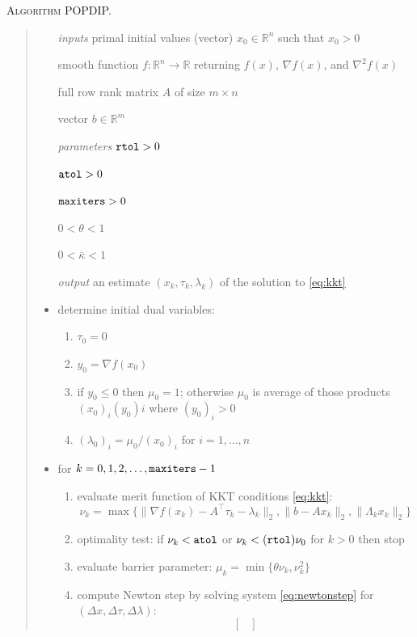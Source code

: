 \documentclass[11pt]{article}
\newcommand{\RR}{\mathbb{R}}
\newcommand{\grad}{\nabla}
\begin{document}
\bigskip
\noindent \textsc{Algorithm POPDIP.}
\begin{quote}
\begin{itemize}
\item[\emph{inputs}]  primal initial values (vector) $x_0\in\RR^n$ such that $x_0 > 0$
\item[]  smooth function $f:\RR^n\to\RR$ returning $f(x)$, $\grad f(x)$, and $\grad^2 f(x)$
\item[]  full row rank matrix $A$ of size $m\times n$
\item[]  vector $b\in\RR^m$
\item[\emph{parameters}]  $\text{\texttt{rtol}}>0$
\item[]  $\text{\texttt{atol}}>0$
\item[]  $\text{\texttt{maxiters}}>0$
\item[]  $0<\theta<1$
\item[]  $0<\bar\kappa<1$
\item[\emph{output}]  an estimate $(x_k,\tau_k,\lambda_k)$ of the solution to \eqref{eq:kkt}
\item  determine initial dual variables:
    \renewcommand{\labelenumi}{(\roman{enumi})}
    \begin{enumerate}
    \item $\tau_0 = 0$
    \item $y_0 = \grad f(x_0)$
    \item if $y_0 \le 0$ then $\mu_0=1$; otherwise $\mu_0$ is average of those products $(x_0)_i (y_0)i$ where $(y_0)_i > 0$
    \item $(\lambda_0)_i = \mu_0 / (x_0)_i$ for $i=1,\dots,n$
    \end{enumerate}
\item  for $k=0,1,2,\dots,\text{\texttt{maxiters}}-1$
    \renewcommand{\labelenumi}{(\roman{enumi})}
    \begin{enumerate}
    \item evaluate merit function of KKT conditions \eqref{eq:kkt}:
    $$\nu_k = \max\{\|\grad f(x_k)-A^\top \tau_k - \lambda_k\|_2,\|b-Ax_k\|_2,\|\Lambda_k x_k\|_2\}$$
    \item optimality test: if $\nu_k<\text{\texttt{atol}}$ or $\nu_k<(\text{\texttt{rtol}}) \nu_0$ for $k>0$ then stop
    \item evaluate barrier parameter: $\mu_k = \min\{\theta \nu_k,\nu_k^2\}$
    \item compute Newton step by solving system \eqref{eq:newtonstep} for $(\Delta x,\Delta \tau,\Delta \lambda)$:
    $$\begin{bmatrix}

\end{bmatrix}$$
\end{enumerate}
\end{itemize}
\end{quote}
\end{document}
